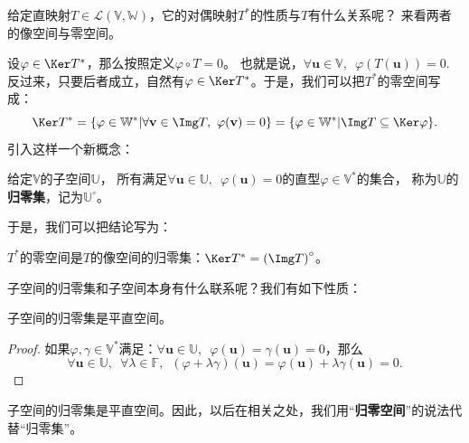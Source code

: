 \documentclass[12pt,UTF8,fontset=none]{ctexbook}
\begin{document}
给定直映射$T \in \mathcal{L}(\mathbb{V}, \mathbb{W})$，它的对偶映射$T^*$的性质与$T$有什么关系呢？
来看两者的像空间与零空间。

设$\varphi \in \Ker T^*$，那么按照定义$\varphi \circ T = 0$。
也就是说，$\forall \mathbf{u} \in \mathbb{V}, \,\,\, \varphi(T(\mathbf{u})) = 0.$ 
反过来，只要后者成立，自然有$\varphi \in \Ker T^*$。于是，我们可以把$T^*$的零空间写成：
$$ \Ker T^* = \{\varphi \in \mathbb{W}^* | \forall \mathbf{v} \in \Img T, \,\, \varphi(\mathbf{v}) = 0 \} = \{\varphi \in \mathbb{W}^* |\Img T \subseteq \Ker \varphi \}. $$
引入这样一个新概念：

\begin{df}\label{df:3_3}
给定$\mathbb{V}$的子空间$\mathbb{U}$，
所有满足$\forall \mathbf{u} \in \mathbb{U} , \,\,\, \varphi(\mathbf{u}) = 0$的直型$\varphi  \in \mathbb{V}^*$的集合，
称为$\mathbb{U}$的\textbf{归零集}，记为$\mathbb{U}^\circ$。
\end{df}
于是，我们可以把结论写为：

\begin{pp}\label{pp:3_7}
$T^*$的零空间是$T$的像空间的归零集：$\Ker T^* = \left(\Img T\right)^\circ$。
\end{pp}
子空间的归零集和子空间本身有什么联系呢？我们有如下性质：

\begin{pp}\label{pp:3_8}
子空间的归零集是平直空间。
\end{pp}
\begin{proof} %
如果$\varphi , \gamma  \in \mathbb{V}^*$满足：$\forall \mathbf{u} \in \mathbb{U} , \,\,\, \varphi(\mathbf{u}) = \gamma (\mathbf{u})= 0$，那么
$$ \forall \mathbf{u} \in \mathbb{U} , \,\,\,\forall \lambda \in \mathbb{F}, \,\,\, (\varphi + \lambda \gamma) (\mathbf{u}) = \varphi (\mathbf{u}) + \lambda \gamma(\mathbf{u})  = 0.$$
\end{proof}

子空间的归零集是平直空间。因此，以后在相关之处，我们用“\textbf{归零空间}”的说法代替“归零集”。
\end{document}
